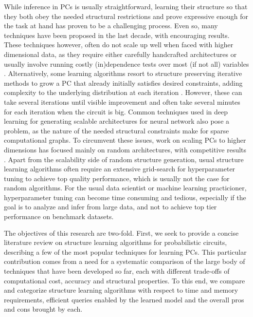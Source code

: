 While inference in PCs is usually straightforward, learning their structure so that they both
obey the needed structural restrictions and prove expressive enough for the task at hand has proven
to be a challenging process. Even so, many techniques have been proposed in the last decade, with
encouraging results. These techniques however, often do not scale up well when faced with higher
dimensional data, as they require either carefully handcrafted architectures
\citep{poon11,cheng14,nath16} or usually involve running costly (in)dependence tests over most (if
not all) variables \citep{gens13,jaini18a,vergari15,dimauro17a}. Alternatively, some learning
algorithms resort to structure preserving iterative methods to grow a PC that already initially
satisfies desired constraints, adding complexity to the underlying distribution at each iteration
\citep{liang17,dang20}. However, these can take several iterations until visible improvement and
often take several minutes for each iteration when the circuit is big. Common techniques used in
deep learning for generating scalable architectures for neural network also pose a problem, as the
nature of the needed structural constraints make for sparse computational graphs. To circumvent
these issues, work on scaling PCs to higher dimensions has focused mainly on random architectures,
with competitive results \citep{peharz20a,dimauro21,geh21a,peharz20b}. Apart from the scalability
side of random structure generation, usual structure learning algorithms often require an extensive
grid-search for hyperparameter tuning to achieve top quality performance, which is usually not the
case for random algorithms. For the usual data scientist or machine learning practicioner,
hyperparameter tuning can become time consuming and tedious, especially if the goal is to analyze
and infer from large data, and not to achieve top tier performance on benchmark datasets.

The objectives of this research are two-fold. First, we seek to provide a concise literature
review on structure learning algorithms for probabilistic circuits, describing a few of the most
popular techniques for learning PCs. This particular contribution comes from a need for a
systematic comparison of the large body of techniques that have been developed so far, each with
different trade-offs of computational cost, accuracy and structural properties. To this end, we
compare and categorize structure learning algorithms with respect to time and memory requirements,
efficient queries enabled by the learned model and the overall pros and cons brought by each.

